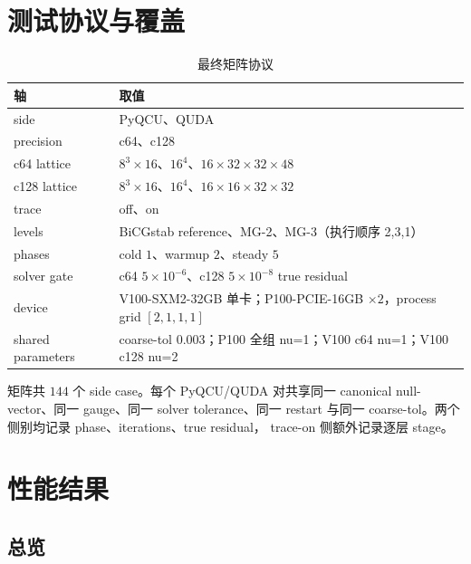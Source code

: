 \documentclass[UTF8,a4paper,11pt]{ctexart}
\begin{document}
\section{测试协议与覆盖}

\begin{table}[htbp]
\centering
\small
\caption{最终矩阵协议}
\begin{tabularx}{\textwidth}{@{}L{0.25\textwidth}Y@{}}
\toprule
轴 & 取值 \\
\midrule
side & PyQCU、QUDA \\
precision & c64、c128  \\
c64 lattice & \(8^3\times16\)、\(16^4\)、\(16\times32\times32\times48\) \\
c128 lattice & \(8^3\times16\)、\(16^4\)、\(16\times16\times32\times32\) \\
trace & off、on \\
levels & BiCGstab reference、MG-2、MG-3（执行顺序 2,3,1） \\
phases & cold \(1\)、warmup \(2\)、steady \(5\) \\
solver gate & c64 \(5\times10^{-6}\)、c128 \(5\times10^{-8}\) true residual \\
device & V100-SXM2-32GB 单卡；P100-PCIE-16GB \(\times2\)，process grid \([2,1,1,1]\) \\
shared parameters & coarse-tol \(0.003\)；P100 全组 nu=1；V100 c64 nu=1；V100 c128 nu=2 \\
\bottomrule
\end{tabularx}
\end{table}

矩阵共 \(144\) 个 side case。每个 PyQCU/QUDA 对共享同一 canonical
null-vector、同一 gauge、同一 solver tolerance、同一 restart 与同一
coarse-tol。两个侧别均记录 phase、iterations、true residual，
trace-on 侧额外记录逐层 stage。

\section{性能结果}

\subsection{总览}
\end{document}
